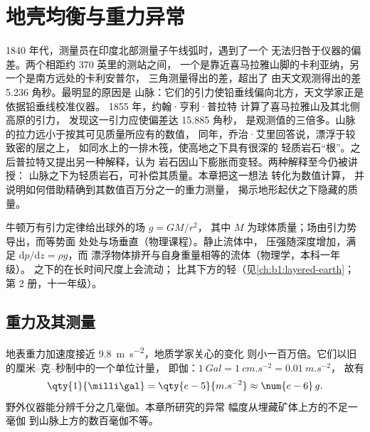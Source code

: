 \chapter{地壳均衡与重力异常}\label{ch:b1:isostasy-gravity}

1840 年代，测量员在印度北部测量子午线弧时，遇到了一个
无法归咎于仪器的偏差。两个相距约 370 英里的测站之间，
一个是靠近喜马拉雅山脚的卡利亚纳，另一个是南方远处的卡利安普尔，
三角测量得出的差，超出了
由天文观测得出的差 5.236 角秒。最明显的原因是
山脉：它们的引力使铅垂线偏向北方，天文学家正是依据铅垂线校准仪器。
1855 年，约翰·亨利·普拉特
计算了喜马拉雅山及其北侧高原的引力，
发现这一引力应使偏差达 15.885 角秒，
是观测值的三倍多。山脉的拉力远小于按其可见质量所应有的数值，
同年，乔治·艾里回答说，漂浮于较致密的层之上，
如同水上的一排木筏，使高地之下具有很深的
轻质岩石“根”。之后普拉特又提出另一种解释，认为
岩石因山下膨胀而变轻。两种解释至今仍被讲授：
山脉之下为轻质岩石，可补偿其质量。本章把这一想法
转化为数值计算，
并说明如何借助精确到其数值百万分之一的重力测量，
揭示地形起伏之下隐藏的质量。

\begin{recall}
牛顿万有引力定律给出球外的场 $g = GM/r^2$，
其中 $M$ 为球体质量；场由引力势导出，而等势面
处处与场垂直（物理课程）。静止流体中，
压强随深度增加，满足 $\mathrm dp/\mathrm dz = \rho g$，而
漂浮物体排开与自身重量相等的流体（物理学，本科一年级）。
之下的在长时间尺度上会流动；
比其下方的轻（见\cref{ch:b1:layered-earth}；第 2 册，十一年级）。
\end{recall}

\section{重力及其测量}

地表重力加速度接近
\qty{9.8}{m.s^{-2}}，地质学家关心的变化
则小一百万倍。它们以旧的厘米–克–秒制中的一个单位计量，
即伽：$\qty{1}{Gal} = \qty{1}{cm.s^{-2}} = \qty{0.01}{m.s^{-2}}$，
故有
\[
  \qty{1}{\milli\gal} = \qty{e-5}{m.s^{-2}} \approx \num{e-6}\,g .
\]
野外仪器能分辨千分之几毫伽。本章所研究的异常
幅度从埋藏矿体上方的不足一毫伽
到山脉上方的数百毫伽不等。

